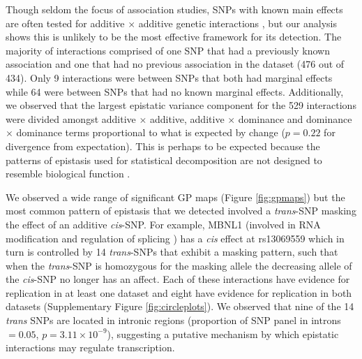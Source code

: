 \documentclass{article}
\begin{document}
Though seldom the focus of association studies, SNPs with known main effects are often tested for additive $\times$ additive genetic interactions \cite{Cordell2009}, but our analysis shows this is unlikely to be the most effective framework for its detection. The majority of interactions comprised of one SNP that had a previously known association and one that had no previous association in the dataset \cite{Powell2013} (476 out of 434). Only 9 interactions were between SNPs that both had marginal effects while 64 were between SNPs that had no known marginal effects. Additionally, we observed that the largest epistatic variance component for the 529 interactions were divided amongst additive $\times$ additive, additive $\times$ dominance and dominance $\times$ dominance terms proportional to what is expected by change ($p = 0.22$ for divergence from expectation). This is perhaps to be expected because the patterns of epistasis used for statistical decomposition are not designed to resemble biological function \cite{Cockerham1954}.

We observed a wide range of significant GP maps (Figure \ref{fig:gpmaps}) but the most common pattern of epistasis that we detected involved a \emph{trans}-SNP masking the effect of an additive \emph{cis}-SNP. For example, MBNL1 (involved in RNA modification and regulation of splicing \cite{Ho2004}) has a \emph{cis} effect at rs13069559 which in turn is controlled by 14 \emph{trans}-SNPs that exhibit a masking pattern, such that when the \emph{trans}-SNP is homozygous for the masking allele the decreasing allele of the \emph{cis}-SNP no longer has an affect. Each of these interactions have evidence for replication in at least one dataset and eight have evidence for replication in both datasets (Supplementary Figure \ref{fig:circleplots}). We observed that nine of the 14 \emph{trans} SNPs are located in intronic regions (proportion of SNP panel in introns $= 0.05$, $p = 3.11 \times 10^{-9}$), suggesting a putative mechanism by which epistatic interactions may regulate transcription.
\end{document}
